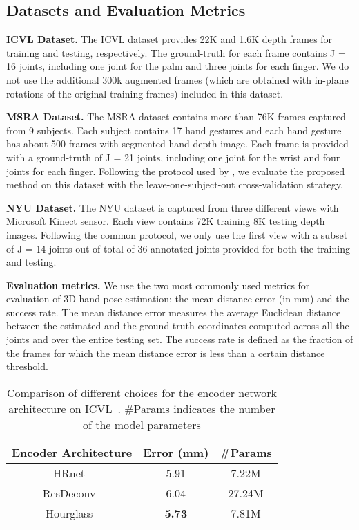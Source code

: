 \documentclass{article}
\begin{document}
\subsection{Datasets and Evaluation Metrics}
\textbf{ICVL Dataset.} The ICVL dataset \cite{tang2014latent} provides 22K and 1.6K depth frames for training and testing, respectively. The ground-truth for each frame contains J = 16 joints, including one joint for the palm and three joints for each finger. We do not use the additional 300k augmented frames (which are obtained with in-plane rotations of the original training frames) included in this dataset.
\par
\textbf{MSRA Dataset.} The MSRA dataset \cite{sun2015cascaded} contains more than 76K frames captured from 9 subjects. Each subject contains 17 hand gestures and each hand gesture has about 500 frames with segmented hand depth image. Each frame is provided with a ground-truth of J = 21 joints, including one joint for the wrist and four joints for each finger. Following the protocol used by \cite{sun2015cascaded}, we evaluate the proposed method on this dataset with the leave-one-subject-out cross-validation strategy.
\par
\textbf{NYU Dataset.} The NYU dataset \cite{tompson2014real} is captured from three different views with Microsoft Kinect sensor. Each view contains 72K training 8K testing depth images. Following the common protocol, we only use the first view with a subset of J = 14 joints out of total of 36 annotated joints provided for both the training and testing.
\par
\textbf{Evaluation metrics.}
 We use the two most commonly used metrics for evaluation of 3D hand pose estimation: the mean distance error (in mm) and the success rate. The mean distance error measures the average Euclidean distance between the estimated and the ground-truth coordinates computed across all the joints and over the entire testing set. The success rate is defined as the fraction of the frames for which the mean distance error is less than a certain distance threshold.
 
 
 \begin{table}[t]
\caption{Comparison of different choices for the encoder network architecture on ICVL~\cite{tang2014latent}. \#Params indicates the number of the model parameters}
\centering
\setlength{\tabcolsep}{10pt}
\renewcommand{\arraystretch}{1.05}
\begin{tabular}{ccc}
            \hline
            Encoder Architecture  &   Error (mm)          & \#Params              \\
            \hline
                HRnet~\cite{wang2020deep}              &         5.91     &   7.22M        \\
                ResDeconv~\cite{xiao2018simple}        &         6.04     &   27.24M      \\
                Hourglass~\cite{newell2016stacked}     &  \textbf{5.73}    &   7.81M       \\
        
            \hline
        \end{tabular}
\label{tab:encoderArcitecture}
\end{table}
\end{document}

